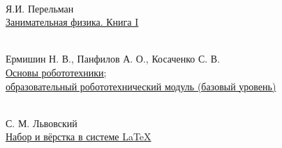 \begin{thebibliography}{99}
\clearpage

 \\
Я.И. Перельман\\
\href{https://www.eduspb.com/public/books/nauch_pop_uch/perelman_fizika1.pdf}{Занимательная
физика. Книга I}
	
\clearpage

 \\
	Ермишин Н. В., Панфилов А. О., Косаченко С. В.\\
	\href{http://examen-technolab.ru/instuctions/tv-0441-m-2.pdf}{Основы
	робототехники;\\образовательный робототехнический модуль (базовый уровень)}

\clearpage

 \\
	С. М. Львовский \\
\href{https://www.mccme.ru/free-books/llang/newllang.pdf}{Набор и вёрстка в
системе \LaTeX}


\end{thebibliography}
